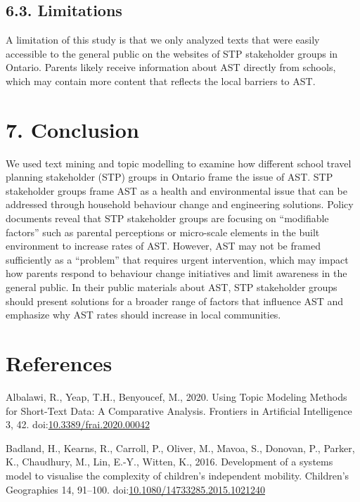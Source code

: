 \documentclass[]{elsarticle} %
\begin{document}
\hypertarget{limitations}{%
\subsection{6.3. Limitations}\label{limitations}}

A limitation of this study is that we only analyzed texts that were
easily accessible to the general public on the websites of STP
stakeholder groups in Ontario. Parents likely receive information about
AST directly from schools, which may contain more content that reflects
the local barriers to AST.

\hypertarget{conclusion}{%
\section{7. Conclusion}\label{conclusion}}

We used text mining and topic modelling to examine how different school
travel planning stakeholder (STP) groups in Ontario frame the issue of
AST. STP stakeholder groups frame AST as a health and environmental
issue that can be addressed through household behaviour change and
engineering solutions. Policy documents reveal that STP stakeholder
groups are focusing on ``modifiable factors'' such as parental
perceptions or micro-scale elements in the built environment to increase
rates of AST. However, AST may not be framed sufficiently as a
``problem'' that requires urgent intervention, which may impact how
parents respond to behaviour change initiatives and limit awareness in
the general public. In their public materials about AST, STP stakeholder
groups should present solutions for a broader range of factors that
influence AST and emphasize why AST rates should increase in local
communities.

\hypertarget{references}{%
\section*{References}\label{references}}

\hypertarget{refs}{}
\leavevmode\hypertarget{ref-albalawiUsingTopicModeling2020}{}%
Albalawi, R., Yeap, T.H., Benyoucef, M., 2020. Using Topic Modeling
Methods for Short-Text Data: A Comparative Analysis. Frontiers in
Artificial Intelligence 3, 42.
doi:\href{https://doi.org/10.3389/frai.2020.00042}{10.3389/frai.2020.00042}

\leavevmode\hypertarget{ref-badlandDevelopmentSystemsModel2016}{}%
Badland, H., Kearns, R., Carroll, P., Oliver, M., Mavoa, S., Donovan,
P., Parker, K., Chaudhury, M., Lin, E.-Y., Witten, K., 2016. Development
of a systems model to visualise the complexity of children's independent
mobility. Children's Geographies 14, 91--100.
doi:\href{https://doi.org/10.1080/14733285.2015.1021240}{10.1080/14733285.2015.1021240}
\end{document}
